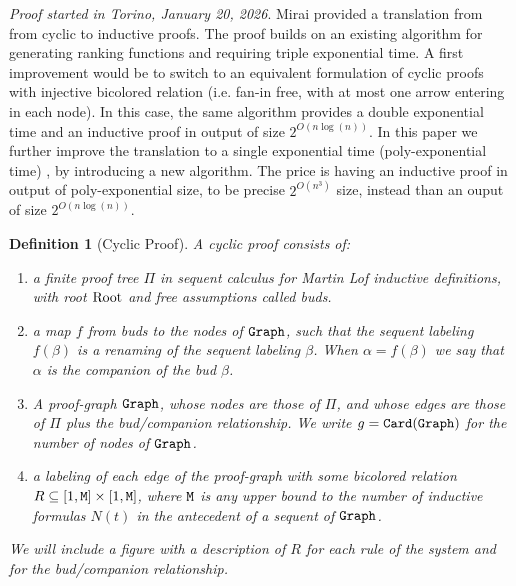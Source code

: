 \documentclass{lmcs}
\newtheorem{definition}[theorem]{Definition}
\begin{document}
\maketitle


\emph{Proof started in Torino, January 20, 2026}. 
Mirai \cite{Mirai} provided a translation from from cyclic to inductive proofs. The proof builds
on an existing algorithm for generating ranking functions and 
requiring triple exponential time. A first improvement would be to switch to an equivalent
formulation of cyclic proofs with injective bicolored relation (i.e. fan-in free, with at most one
arrow entering in each node). 
In this case, the same algorithm provides a double exponential time \cite{Lee2} 
and an inductive proof in output of size $2^{O(n \log(n))}$.
In this paper we further improve the translation to a single exponential time
(poly-exponential time) , by introducing a new algorithm. The price is having an inductive proof 
in output of poly-exponential size, to be precise $2^{O(n^3)}$ size, instead than an ouput 
of size $2^{O(n \log(n))}$.

\begin{definition}[Cyclic Proof]
\label{definition-cyclic-proof}
A cyclic proof consists of:
\begin{enumerate}
\item 
a finite proof tree $\Pi$ in sequent calculus for Martin Lof inductive definitions, with 
root ${\rm Root}$ and free assumptions called \emph{buds}. 
\item 
a map $f$ from buds to the nodes of ${\tt Graph}$, such that the sequent labeling $f(\beta)$ is a renaming of the sequent labeling $\beta$. When $\alpha = f(\beta)$ we say that
$\alpha$ is the \emph{companion} of the bud $\beta$. 
\item 
A proof-graph ${\tt Graph}$, whose nodes are those of $\Pi$, and whose edges are those 
of $\Pi$ plus the bud/companion relationship. We write $g = {\tt Card}({\tt Graph})$ for the 
number of nodes of ${\tt Graph}$.
\item
a labeling of each edge of the proof-graph with some bicolored relation 
$R \subseteq [1,{\tt M}] \times [1,{\tt M}]$, where  ${\tt M}$ is any upper bound to
the number of inductive formulas $N(t)$ in the antecedent of a sequent of ${\tt Graph}$. 
\end{enumerate}
We will include a figure with a description of $R$ for each rule of the system and for the 
bud/companion relationship.
\end{definition}
\end{document}
